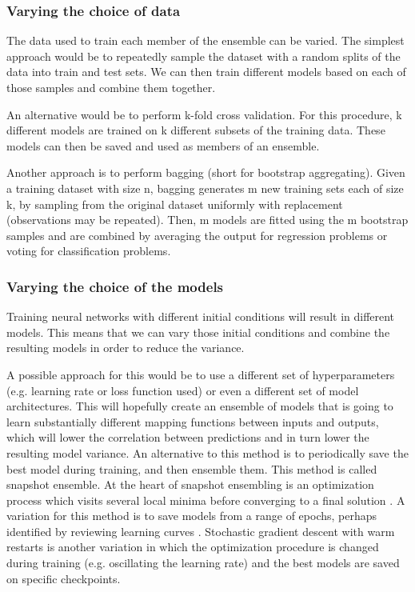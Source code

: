 \subsubsection{Varying the choice of data}
The data used to train each member of the ensemble can be varied. 
The simplest approach would be to repeatedly sample the dataset with a random splits of the data into train and test sets. We can then train different models based on each of those samples and combine them together.  \par
An alternative would be to perform k-fold cross validation. For this procedure, k different models are trained on k different subsets of the training data. These models can then be saved and used as members of an ensemble. \par
Another approach is to perform bagging (short for bootstrap aggregating). Given a training dataset with size n, bagging generates m new training sets each of size k, by sampling from the original dataset uniformly with replacement (observations may be repeated). Then, m models are fitted using the m bootstrap samples and are combined by averaging the output for regression problems or voting for classification problems. \par

\subsubsection{Varying the choice of the models}
Training neural networks with different initial conditions will result in different models. This means that we can vary those initial conditions and combine the resulting models in order to reduce the variance. \par
A possible approach for this would be to use a different set of hyperparameters (e.g. learning rate or loss function used) or even a different set of model architectures. This will hopefully create an ensemble of models that is going to learn substantially different mapping functions between inputs and outputs, which will lower the correlation between predictions and in turn lower the resulting model variance.
An alternative to this method is to periodically save the best model during training, and then ensemble them. This method is called snapshot  ensemble. At the heart of snapshot ensembling is an optimization process which visits several local minima before converging to a final solution \cite{snapshot}. A variation for this method is to save models from a range of epochs, perhaps identified by reviewing learning curves \cite{horizontalvertical}. Stochastic gradient descent with warm restarts \cite{sgdr} is another variation in which the optimization procedure is changed during training (e.g. oscillating the learning rate) and the best models are saved on specific checkpoints.
